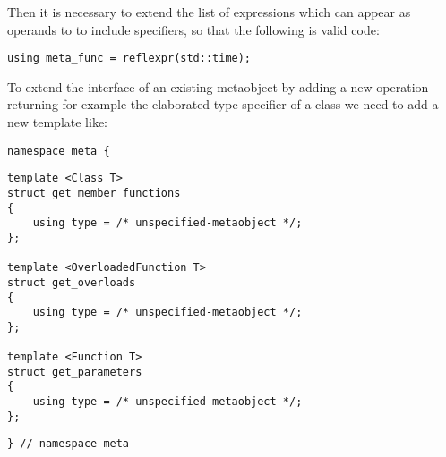 Then it is necessary to extend the list of expressions which can appear
as operands to \verb@reflexpr@ to include specifiers, so that the following
is valid code:

\begin{verbatim}
using meta_func = reflexpr(std::time);
\end{verbatim}

To extend the interface of an existing metaobject by adding a new operation
returning for example the elaborated type specifier of a class we need to
add a new template like:

\begin{verbatim}
namespace meta {
\end{verbatim}
\begin{verbatim}
template <Class T>
struct get_member_functions
{
	using type = /* unspecified-metaobject */;
};

template <OverloadedFunction T>
struct get_overloads
{
	using type = /* unspecified-metaobject */;
};

template <Function T>
struct get_parameters
{
	using type = /* unspecified-metaobject */;
};

\end{verbatim}
\begin{verbatim}
} // namespace meta
\end{verbatim}

